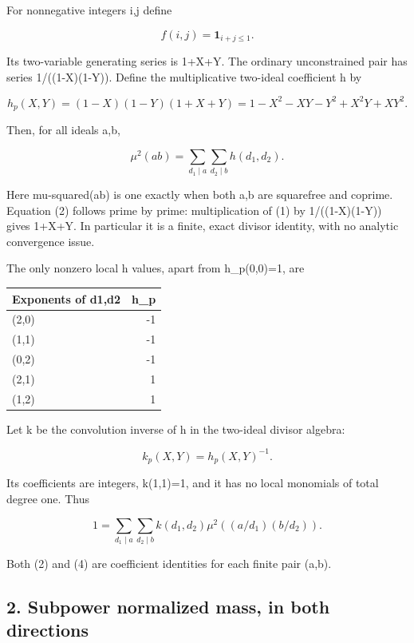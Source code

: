 For nonnegative integers i,j define

\[
 f(i,j)=\mathbf 1_{i+j\le1}.
\]

Its two-variable generating series is 1+X+Y. The ordinary unconstrained pair has series 1/((1-X)(1-Y)). Define the multiplicative two-ideal coefficient h by

\[
 h_p(X,Y)=(1-X)(1-Y)(1+X+Y)
 =1-X^2-XY-Y^2+X^2Y+XY^2.                 \tag{1}
\]

Then, for all ideals a,b,

\[
 \mu^2(ab)=\sum_{d_1\mid a}\sum_{d_2\mid b}h(d_1,d_2).       \tag{2}
\]

Here mu-squared(ab) is one exactly when both a,b are squarefree and coprime. Equation (2) follows prime by prime: multiplication of (1) by 1/((1-X)(1-Y)) gives 1+X+Y. In particular it is a finite, exact divisor identity, with no analytic convergence issue.

The only nonzero local h values, apart from h\_\allowbreak{}p(0,0)=1, are

\begin{longtable}[]{@{}lr@{}}
\toprule\noalign{}
Exponents of d1,d2 & h\_\allowbreak{}p \\
\midrule\noalign{}
\endhead
\bottomrule\noalign{}
\endlastfoot
(2,0) & -1 \\
(1,1) & -1 \\
(0,2) & -1 \\
(2,1) & 1 \\
(1,2) & 1 \\
\end{longtable}

Let k be the convolution inverse of h in the two-ideal divisor algebra:

\[
 k_p(X,Y)=h_p(X,Y)^{-1}.                         \tag{3}
\]

Its coefficients are integers, k(1,1)=1, and it has no local monomials of total degree one. Thus

\[
 1=\sum_{d_1\mid a}\sum_{d_2\mid b}
 k(d_1,d_2)\mu^2((a/d_1)(b/d_2)).                \tag{4}
\]

Both (2) and (4) are coefficient identities for each finite pair (a,b).

\hypertarget{sources:subpower-normalized-mass-in-both-directions}{%
\subsection{2. Subpower normalized mass, in both directions}\label{sources:subpower-normalized-mass-in-both-directions}}

